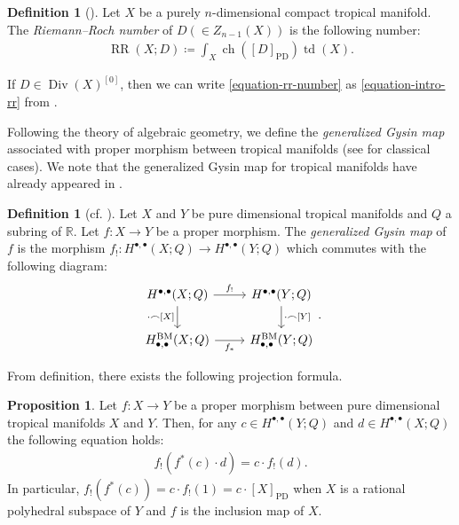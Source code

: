 \documentclass[a4paper,dvipdfmx,reqno,12pt]{amsart}
\theoremstyle{definition}
\newtheorem{definition}[theorem]{Definition}
\newtheorem{proposition}[theorem]{Proposition}
\newcommand{\deq}{\coloneqq}
\newcommand{\opn}[1]{\operatorname{#1}}
\newcommand{\PD}[1]{[#1]_{\mathrm{PD}}}
\numberwithin{equation}{section}
\begin{document}
\begin{definition}[{\cite[.(2)]{MR1335917}}]
\label{definition-rr-number}
Let $X$ be a purely $n$-dimensional
compact tropical manifold.
The \emph{Riemann--Roch number}
of $D(\in Z_{n-1}(X))$ is the following number:
\begin{align}
\label{equation-rr-number}
\opn{RR}(X;D)\deq \int_X \opn{ch}(\PD{D})\opn{td}(X).
\end{align}
\end{definition}
If $D\in \opn{Div}(X)^{[0]}$,
then we can write \cref{equation-rr-number}
as \cref{equation-intro-rr}
from \cite[Proposition 5.12]{MR4637248}.

Following the theory of algebraic geometry,
we define the \emph{generalized Gysin map}
associated with proper morphism between
tropical manifolds (see  
\cite[Chapter 13. Appendix]{MR2810322}
for classical cases).
We note that the generalized Gysin map
for tropical manifolds
have already appeared in \cite{amini2020hodge}.
\begin{definition}[{cf. \cite{amini2020hodge}}]
Let $X$ and $Y$ be pure dimensional tropical manifolds
and $Q$ a subring of $\mathbb{R}$.
Let $f\colon X\to Y$ be a proper morphism.
The \emph{generalized Gysin map} of $f$ is 
the morphism $f_!\colon H^{\bullet,\bullet}(X;Q)\to 
H^{\bullet,\bullet}(Y;Q)$
which commutes with the following diagram:
\begin{equation}
\begin{tikzcd}
	{H^{\bullet,\bullet}(X;Q)} & {H^{\bullet,\bullet}(Y;Q)} \\
	{H_{\bullet,\bullet}^{\mathrm{BM}}(X;Q)} & {H_{\bullet,\bullet}^{\mathrm{BM}}(Y;Q)}
	\arrow["{\cdot \frown [X]}"', from=1-1, to=2-1]
	\arrow["{\cdot\frown[Y]}", from=1-2, to=2-2]
	\arrow["{f_*}"', from=2-1, to=2-2]
	\arrow["{f_!}", from=1-1, to=1-2]
\end{tikzcd}.   
\end{equation}

\end{definition}
From definition, there exists the following projection formula.
\begin{proposition}
\label{equation-gysin-projection-formula}
Let $f\colon X\to Y$ be a proper morphism
between pure dimensional
tropical manifolds $X$ and $Y$.
Then, for any $c\in H^{\bullet,\bullet}(Y;Q) $ and
$d\in H^{\bullet,\bullet}(X;Q)$ the following equation holds:
\begin{align}
    f_!(f^{*}(c)\cdot d)=c\cdot f_!(d).
\end{align}
In particular, $f_!(f^{*}(c))=c\cdot f_!(1)=c\cdot \PD{X}$
when $X$ is a rational polyhedral subspace of $Y$ and 
$f$ is the inclusion map of $X$.
\end{proposition}
\end{document}
